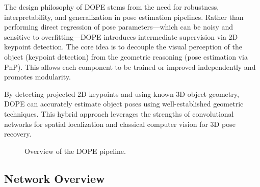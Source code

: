 \documentclass[conference]{IEEEtran}
\begin{document}
The design philosophy of DOPE stems from the need for robustness, interpretability, and generalization in pose estimation pipelines. Rather than performing direct regression of pose parameters—which can be noisy and sensitive to overfitting—DOPE introduces intermediate supervision via 2D keypoint detection. The core idea is to decouple the visual perception of the object (keypoint detection) from the geometric reasoning (pose estimation via PnP). This allows each component to be trained or improved independently and promotes modularity.

By detecting projected 2D keypoints and using known 3D object geometry, DOPE can accurately estimate object poses using well-established geometric techniques. This hybrid approach leverages the strengths of convolutional networks for spatial localization and classical computer vision for 3D pose recovery.


\begin{figure}[ht]
  \centering
  \caption{Overview of the DOPE pipeline.}
  \label{fig:dope_flowchart}
\end{figure}

\subsection{Network Overview}
\end{document}
